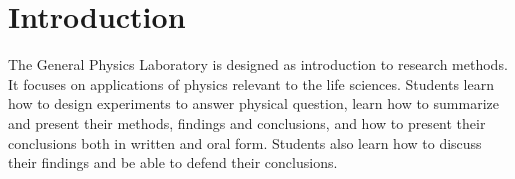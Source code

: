 \clearpage
\setcounter{page}{1}

\chapter*{Introduction}
\thispagestyle{fancy}
The General Physics Laboratory is designed as introduction to research methods.
It focuses on applications of physics relevant to the life sciences.
Students learn how to design experiments to answer physical question, learn how to summarize and present their methods, findings and conclusions, and how to present their conclusions both in written and oral form.
Students also learn how to discuss their findings and be able to defend their conclusions.

